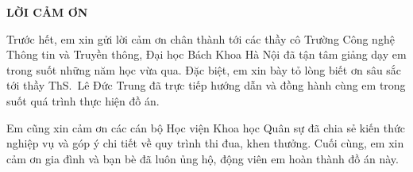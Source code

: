 \documentclass[../DoAn.tex]{subfiles}
\begin{document}
\begin{center}
    \Large{\textbf{LỜI CẢM ƠN}}\\
\end{center}
\vspace{1cm}

Trước hết, em xin gửi lời cảm ơn chân thành tới các thầy cô Trường Công nghệ Thông tin và Truyền thông, Đại học Bách Khoa Hà Nội đã tận tâm giảng dạy em trong suốt những năm học vừa qua.
Đặc biệt, em xin bày tỏ lòng biết ơn sâu sắc tới thầy ThS.~Lê Đức Trung đã trực tiếp hướng dẫn và đồng hành cùng em trong suốt quá trình thực hiện đồ án.

Em cũng xin cảm ơn các cán bộ Học viện Khoa học Quân sự đã chia sẻ kiến thức nghiệp vụ và góp ý chi tiết về quy trình thi đua, khen thưởng.
Cuối cùng, em xin cảm ơn gia đình và bạn bè đã luôn ủng hộ, động viên em hoàn thành đồ án này.
\end{document}
